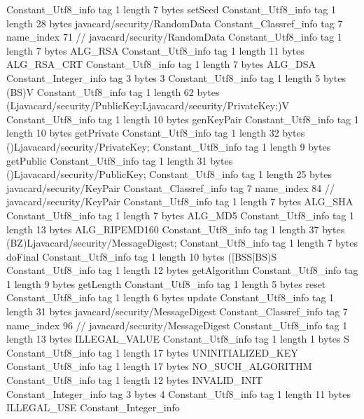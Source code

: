{{{		}
		Constant_Utf8_info {
			tag	1
			length	7
			bytes	setSeed
		}
		Constant_Utf8_info {
			tag	1
			length	28
			bytes	javacard/security/RandomData
		}
		Constant_Classref_info {
			tag	7
			name_index	71		// javacard/security/RandomData
		}
		Constant_Utf8_info {
			tag	1
			length	7
			bytes	ALG_RSA
		}
		Constant_Utf8_info {
			tag	1
			length	11
			bytes	ALG_RSA_CRT
		}
		Constant_Utf8_info {
			tag	1
			length	7
			bytes	ALG_DSA
		}
		Constant_Integer_info {
			tag	3
			bytes	3
		}
		Constant_Utf8_info {
			tag	1
			length	5
			bytes	(BS)V
		}
		Constant_Utf8_info {
			tag	1
			length	62
			bytes	(Ljavacard/security/PublicKey;Ljavacard/security/PrivateKey;)V
		}
		Constant_Utf8_info {
			tag	1
			length	10
			bytes	genKeyPair
		}
		Constant_Utf8_info {
			tag	1
			length	10
			bytes	getPrivate
		}
		Constant_Utf8_info {
			tag	1
			length	32
			bytes	()Ljavacard/security/PrivateKey;
		}
		Constant_Utf8_info {
			tag	1
			length	9
			bytes	getPublic
		}
		Constant_Utf8_info {
			tag	1
			length	31
			bytes	()Ljavacard/security/PublicKey;
		}
		Constant_Utf8_info {
			tag	1
			length	25
			bytes	javacard/security/KeyPair
		}
		Constant_Classref_info {
			tag	7
			name_index	84		// javacard/security/KeyPair
		}
		Constant_Utf8_info {
			tag	1
			length	7
			bytes	ALG_SHA
		}
		Constant_Utf8_info {
			tag	1
			length	7
			bytes	ALG_MD5
		}
		Constant_Utf8_info {
			tag	1
			length	13
			bytes	ALG_RIPEMD160
		}
		Constant_Utf8_info {
			tag	1
			length	37
			bytes	(BZ)Ljavacard/security/MessageDigest;
		}
		Constant_Utf8_info {
			tag	1
			length	7
			bytes	doFinal
		}
		Constant_Utf8_info {
			tag	1
			length	10
			bytes	([BSS[BS)S
		}
		Constant_Utf8_info {
			tag	1
			length	12
			bytes	getAlgorithm
		}
		Constant_Utf8_info {
			tag	1
			length	9
			bytes	getLength
		}
		Constant_Utf8_info {
			tag	1
			length	5
			bytes	reset
		}
		Constant_Utf8_info {
			tag	1
			length	6
			bytes	update
		}
		Constant_Utf8_info {
			tag	1
			length	31
			bytes	javacard/security/MessageDigest
		}
		Constant_Classref_info {
			tag	7
			name_index	96		// javacard/security/MessageDigest
		}
		Constant_Utf8_info {
			tag	1
			length	13
			bytes	ILLEGAL_VALUE
		}
		Constant_Utf8_info {
			tag	1
			length	1
			bytes	S
		}
		Constant_Utf8_info {
			tag	1
			length	17
			bytes	UNINITIALIZED_KEY
		}
		Constant_Utf8_info {
			tag	1
			length	17
			bytes	NO_SUCH_ALGORITHM
		}
		Constant_Utf8_info {
			tag	1
			length	12
			bytes	INVALID_INIT
		}
		Constant_Integer_info {
			tag	3
			bytes	4
		}
		Constant_Utf8_info {
			tag	1
			length	11
			bytes	ILLEGAL_USE
		}
		Constant_Integer_info {
}}}
